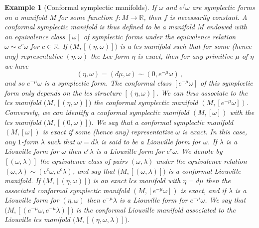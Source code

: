 \documentclass{amsart}
\newtheorem{example}[thm]{Example}
\theoremstyle{remark}
\begin{document}
\begin{example}[Conformal symplectic manifolds]\label{example: symplectic manifolds}
If $\omega$ and $e^f \omega$
are symplectic forms on a manifold $M$
for some function $f: M \rightarrow \mathbb{R}$,
then $f$ is necessarily constant.
A conformal symplectic manifold
is thus defined to be a manifold $M$
endowed with an equivalence class $[\omega]$
of symplectic forms
under the equivalence relation
$\omega \sim e^c \omega$ for $c \in \mathbb{R}$.
If $\big( M , [(\eta, \omega)] \big)$
is a lcs manifold such that
for some (hence any) representative $(\eta, \omega)$
the Lee form $\eta$ is exact,
then for any primitive $\mu$ of $\eta$ we have
\[
(\eta, \omega) = (d\mu, \omega) \sim (0, e^{-\mu}\omega) \,,
\]
and so $e^{-\mu}\omega$ is a symplectic form.
The conformal class $[e^{-\mu}\omega]$
of this symplectic form
only depends on the lcs structure $[(\eta, \omega)]$.
We can thus associate to the lcs manifold $\big( M , [(\eta, \omega)] \big)$
the conformal symplectic manifold $(M, [e^{-\mu}\omega])$.
Conversely,
we can identify a conformal symplectic manifold $(M, [\omega])$
with the lcs manifold $\big( M , [(0, \omega)] \big)$.
We say that a conformal symplectic manifold $(M, [\omega])$ is exact
if some (hence any) representative $\omega$ is exact.
In this case,
any $1$-form $\lambda$
such that $\omega = d\lambda$
is said to be a Liouville form for $\omega$.
If $\lambda$ is a Liouville form for $\omega$
then $e^c \lambda$ is a Liouville form for $e^c \omega$.
We denote by $[(\omega, \lambda)]$
the equivalence class of pairs $(\omega, \lambda)$
under the equivalence relation
$(\omega, \lambda) \sim (e^c \omega, e^c \lambda)$,
and say that $\big( M, [(\omega, \lambda)] \big)$
is a conformal Liouville manifold.
If $\big( M, [(\eta, \omega)] \big)$
is an exact lcs manifold
with $\eta = d\mu$
then the associated conformal symplectic manifold
$(M, [e^{-\mu} \omega])$ is exact,
and if $\lambda$ is a Liouville form for $(\eta, \omega)$
then $e^{-\mu} \lambda$ is a Liouville form
for $e^{-\mu} \omega$.
We say that $\big( M, [( e^{-\mu} \omega, e^{-\mu} \lambda )] \big)$
is the conformal Liouville manifold
associated to the Liouville lcs manifold
$\big( M, [(\eta, \omega, \lambda)] \big)$.
\end{example}
\end{document}

